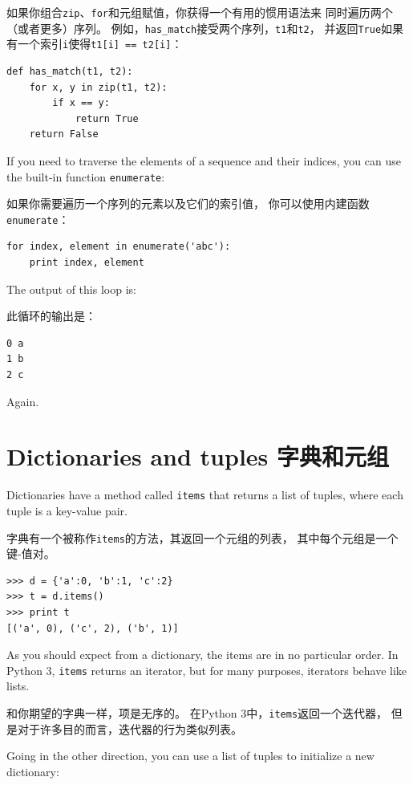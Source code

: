 \documentclass[10pt]{book}
\begin{document}
\begin{CJK}{UTF8}{gbsn}
如果你组合{\tt zip}、{\tt for}和元组赋值，你获得一个有用的惯用语法来
同时遍历两个（或者更多）序列。
例如，\verb"has_match"接受两个序列，{\tt t1}和{\tt t2}，
并返回{\tt True}如果有一个索引{\tt i}使得{\tt t1[i] == t2[i]}：

\begin{verbatim}
def has_match(t1, t2):
    for x, y in zip(t1, t2):
        if x == y:
            return True
    return False
\end{verbatim}
%
If you need to traverse the elements of a sequence and their
indices, you can use the built-in function {\tt enumerate}:

如果你需要遍历一个序列的元素以及它们的索引值，
你可以使用内建函数{\tt enumerate}：

\begin{verbatim}
for index, element in enumerate('abc'):
    print index, element
\end{verbatim}
%
The output of this loop is:

此循环的输出是：

\begin{verbatim}
0 a
1 b
2 c
\end{verbatim}
%
Again.


\section{Dictionaries and tuples 字典和元组}
\label{dictuple}

Dictionaries have a method called {\tt items} that returns a list of
tuples, where each tuple is a key-value pair.

字典有一个被称作{\tt items}的方法，其返回一个元组的列表，
其中每个元组是一个键-值对。

\begin{verbatim}
>>> d = {'a':0, 'b':1, 'c':2}
>>> t = d.items()
>>> print t
[('a', 0), ('c', 2), ('b', 1)]
\end{verbatim}
%
As you should expect from a dictionary, the items are in no
particular order.  In Python 3, {\tt items} returns an iterator,
but for many purposes, iterators behave like lists.

和你期望的字典一样，项是无序的。
在Python 3中，{\tt items}返回一个迭代器，
但是对于许多目的而言，迭代器的行为类似列表。

Going in the other direction, you can use a list of tuples to
initialize a new dictionary: 


\end{CJK}
\end{document}
